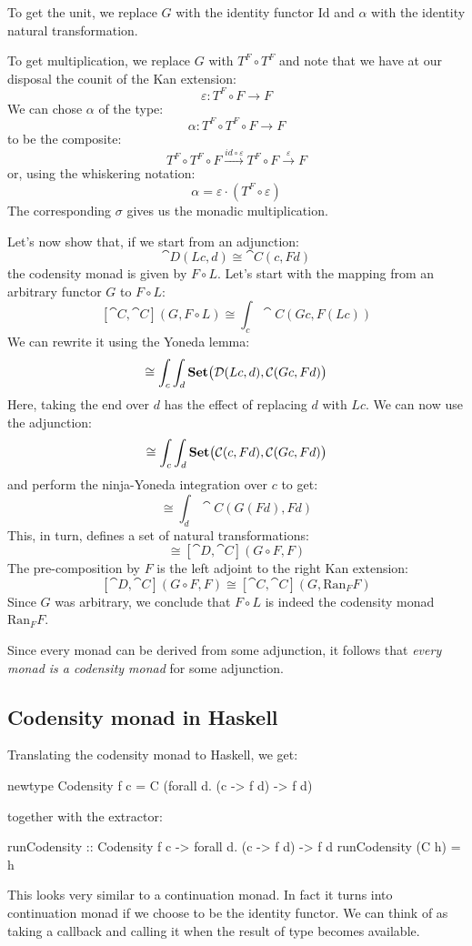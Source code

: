 \documentclass[DaoFP]{subfiles}
\begin{document}
To get the unit, we replace $G$ with the identity functor $\text{Id}$ and $\alpha$ with the identity natural transformation. 

To get multiplication, we replace $G$ with $T^F \circ T^F$ and note that we have at our disposal the counit of the Kan extension:
\[ \varepsilon \colon  T^F \circ F \to F \]
We can chose $\alpha$ of the type:
\[ \alpha \colon T^F \circ T^F \circ F \to F \]
to be the composite:
\[ T^F \circ T^F \circ F \xrightarrow{id \circ \varepsilon} T^F \circ F \xrightarrow{\varepsilon} F\]
or, using the whiskering notation:
\[ \alpha = \varepsilon \cdot (T^F \circ \varepsilon) \]
The corresponding $\sigma$ gives us the monadic multiplication.

Let's now show that, if we start from an adjunction:
\[ \cat D(L c, d) \cong \cat C (c, F d) \]
the codensity monad is given by $F \circ L$. Let's start with the mapping from an arbitrary functor $G$ to $F \circ L$:
\[ [\cat C, \cat C](G, F \circ L) \cong  \int_c \cat C (G c, F (L c)) \]
We can rewrite it using the Yoneda lemma:
\[ \cong \int_c \int_d \mathbf{Set}\big(\mathcal{D}(L c, d), \mathcal{C} (G c, F d)\big) \]
Here, taking the end over $d$ has the effect of replacing $d$ with $L c$. We can now use the adjunction:
\[ \cong \int_c \int_d \mathbf{Set}\big(\mathcal{C}(c, F d), \mathcal{C} (G c, F d)\big) \]
and perform the ninja-Yoneda integration over $c$ to get:
\[ \cong \int_d \cat C (G (F d), F d) \]
This, in turn, defines a set of natural transformations:
\[ \cong [\cat D, \cat C](G \circ F, F) \]
The pre-composition by $F$ is the left adjoint to the right Kan extension:
\[ [\cat D, \cat C](G \circ F, F) \cong  [\cat C, \cat C] (G, \text{Ran}_F F)\]
Since $G$ was arbitrary, we conclude that $F \circ L$ is indeed the codensity monad $\text{Ran}_F F$.

Since every monad can be derived from some adjunction, it follows that \emph{every monad is a codensity monad} for some adjunction.

\subsection{Codensity monad in Haskell}

Translating the codensity monad to Haskell, we get:
 \begin{haskell}
newtype Codensity f c = C (forall d. (c -> f d) -> f d)
 \end{haskell}
 together with the extractor:
 \begin{haskell}
runCodensity :: Codensity f c -> forall d. (c -> f d) -> f d
runCodensity (C h) = h
 \end{haskell}
This looks very similar to a continuation monad. In fact it turns into continuation monad if we choose  to be the identity functor. We can think of  as taking a callback  and calling it when the result of type  becomes available. 
\end{document}
